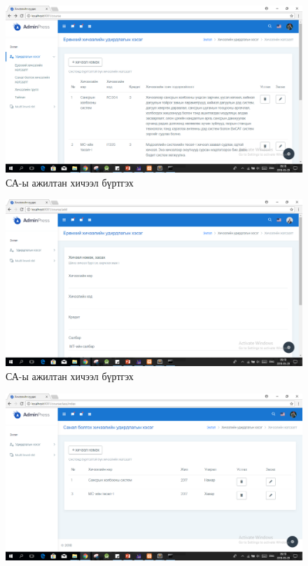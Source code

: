 	\begin{figure}[!h]
		\includegraphics[scale=0.47]{Chart/screen-5}
		\caption[СА-ы ажилтан хичээл бүртгэх]{СА-ы ажилтан хичээл бүртгэх}
		\label{text}
	\end{figure}\begin{center}
	\begin{figure}[!h]
		\includegraphics[scale=0.42]{Chart/screen-6}
		\caption[СА-ы ажилтан хичээл бүртгэх]{СА-ы ажилтан хичээл бүртгэх}
		\label{text}
	\end{figure}
\begin{figure}[!h]
	\includegraphics[scale=0.42]{Chart/screen-7}

\end{figure}
\end{center}

